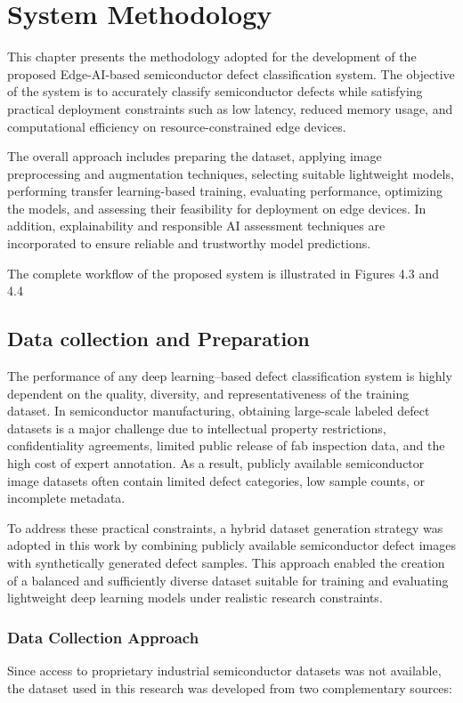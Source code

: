 \chapter{System Methodology}

This chapter presents the methodology adopted for the development of the proposed Edge-AI-based semiconductor defect classification system. The objective of the system is to accurately classify semiconductor defects while satisfying practical deployment constraints such as low latency, reduced memory usage, and computational efficiency on resource-constrained edge devices.

The overall approach includes preparing the dataset, applying image preprocessing and augmentation techniques, selecting suitable lightweight models, performing transfer learning-based training, evaluating performance, optimizing the models, and assessing their feasibility for deployment on edge devices. In addition, explainability and responsible AI assessment techniques are incorporated to ensure reliable and trustworthy model predictions.

The complete workflow of the proposed system is illustrated in Figures 4.3 and 4.4 
\section{Data collection and Preparation}

The performance of any deep learning–based defect classification system is highly dependent on the quality, diversity, and representativeness of the training dataset. In semiconductor manufacturing, obtaining large-scale labeled defect datasets is a major challenge due to intellectual property restrictions, confidentiality agreements, limited public release of fab inspection data, and the high cost of expert annotation. As a result, publicly available semiconductor image datasets often contain limited defect categories, low sample counts, or incomplete metadata.

To address these practical constraints, a hybrid dataset generation strategy was adopted in this work by combining publicly available semiconductor defect images with synthetically generated defect samples. This approach enabled the creation of a balanced and sufficiently diverse dataset suitable for training and evaluating lightweight deep learning models under realistic research constraints.

\subsection{Data Collection Approach}
Since access to proprietary industrial semiconductor datasets was not available, the dataset used in this research was developed from two complementary sources:

